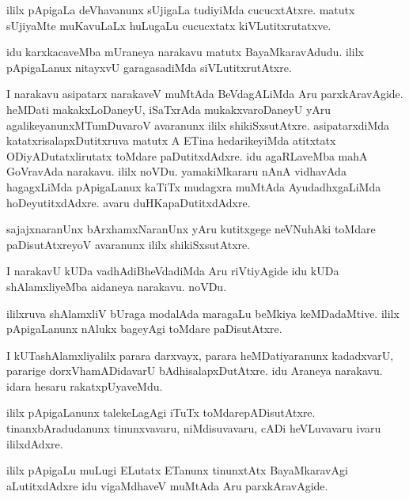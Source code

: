 \documentclass{article}
\begin{document}
\begin{mn}%
ililx pApigaLa deVhavanunx sUjigaLa tudiyiMda cucucxtAtxre. matutx sUjiyaMte muKavuLaLx huLugaLu 
cucucxtatx kiVLutitxrutatxve.
\end{mn}

\begin{mn}%
idu karxkacaveMba mUraneya narakavu matutx BayaMkaravAdudu. ililx pApigaLanux nitayxvU 
garagasadiMda siVLutitxrutAtxre.
\end{mn}

\begin{mn}%
I narakavu asipatarx narakaveV muMtAda BeVdagALiMda Aru parxkAravAgide. heMDati makakxLoDaneyU, 
iSaTxrAda mukakxvaroDaneyU yAru agalikeyanunxMTumDuvaroV avaranunx ililx shikiSxsutAtxre. 
asipatarxdiMda katatxrisalapxDutitxruva matutx A ETina hedarikeyiMda atitxtatx 
ODiyADutatxlirutatx toMdare paDutitxdAdxre. idu agaRLaveMba mahA GoVravAda narakavu. ililx noVDu. 
yamakiMkararu nAnA vidhavAda hagagxLiMda pApigaLanux kaTiTx mudagxra muMtAda AyudadhxgaLiMda 
hoDeyutitxdAdxre. avaru duHKapaDutitxdAdxre.
\end{mn}

\begin{mn}%
sajajxnaranUnx bArxhamxNaranUnx yAru kutitxgege neVNuhAki toMdare paDisutAtxreyoV avaranunx ililx 
shikiSxsutAtxre.
\end{mn}

\begin{mn}%
I narakavU kUDa vadhAdiBheVdadiMda Aru riVtiyAgide idu kUDa shAlamxliyeMba aidaneya narakavu. noVDu.
\end{mn}

\begin{mn}%
ililxruva shAlamxliV bUraga modalAda maragaLu beMkiya keMDadaMtive. ililx pApigaLanunx nAlukx 
bageyAgi toMdare paDisutAtxre.
\end{mn}

\begin{mn}%
I kUTashAlamxliyalilx parara darxvayx, parara heMDatiyaranunx kadadxvarU, pararige 
dorxVhamADidavarU bAdhisalapxDutAtxre. idu Araneya narakavu. idara hesaru rakatxpUyaveMdu.
\end{mn}

\begin{mn}%
ililx pApigaLanunx talekeLagAgi iTuTx toMdarepADisutAtxre. tinanxbAradudanunx tinunxvavaru, 
niMdisuvavaru, cADi heVLuvavaru ivaru ililxdAdxre.
\end{mn}

\begin{mn}%
ililx pApigaLu muLugi ELutatx ETanunx tinunxtAtx BayaMkaravAgi aLutitxdAdxre idu vigaMdhaveV 
muMtAda Aru parxkAravAgide.
\end{mn}
\end{document}
